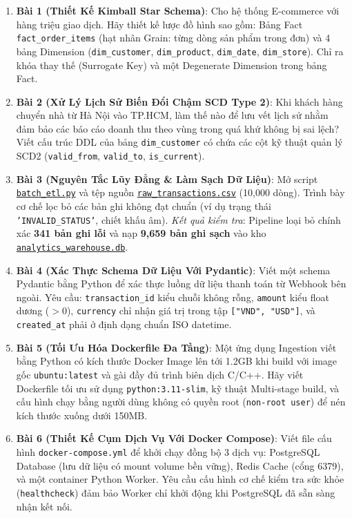 \begin{baitapbox}
\begin{enumerate}
    \item \textbf{Bài 1 (Thiết Kế Kimball Star Schema)}: Cho hệ thống E-commerce với hàng triệu giao dịch. Hãy thiết kế lược đồ hình sao gồm: Bảng Fact \texttt{fact\_order\_items} (hạt nhân Grain: từng dòng sản phẩm trong đơn) và 4 bảng Dimension (\texttt{dim\_customer}, \texttt{dim\_product}, \texttt{dim\_date}, \texttt{dim\_store}). Chỉ ra khóa thay thế (Surrogate Key) và một Degenerate Dimension trong bảng Fact.
    \item \textbf{Bài 2 (Xử Lý Lịch Sử Biến Đổi Chậm SCD Type 2)}: Khi khách hàng chuyển nhà từ Hà Nội vào TP.HCM, làm thế nào để lưu vết lịch sử nhằm đảm bảo các báo cáo doanh thu theo vùng trong quá khứ không bị sai lệch? Viết cấu trúc DDL của bảng \texttt{dim\_customer} có chứa các cột kỹ thuật quản lý SCD2 (\texttt{valid\_from}, \texttt{valid\_to}, \texttt{is\_current}).
    \item \textbf{Bài 3 (Nguyên Tắc Lũy Đẳng \& Làm Sạch Dữ Liệu)}: Mở script \href{run:./code/ch07_etl/batch_etl.py}{\texttt{batch\_etl.py}} và tệp nguồn \href{run:./data/raw_transactions.csv}{\texttt{raw\_transactions.csv}} (10,000 dòng). Trình bày cơ chế lọc bỏ các bản ghi không đạt chuẩn (ví dụ trạng thái \texttt{'INVALID\_STATUS'}, chiết khấu âm). \textit{Kết quả kiểm tra}: Pipeline loại bỏ chính xác \textbf{341 bản ghi lỗi} và nạp \textbf{9,659 bản ghi sạch} vào kho \href{run:./data/analytics_warehouse.db}{\texttt{analytics\_warehouse.db}}.
    \item \textbf{Bài 4 (Xác Thực Schema Dữ Liệu Với Pydantic)}: Viết một schema Pydantic bằng Python để xác thực luồng dữ liệu thanh toán từ Webhook bên ngoài. Yêu cầu: \texttt{transaction\_id} kiểu chuỗi không rỗng, \texttt{amount} kiểu float dương ($> 0$), \texttt{currency} chỉ nhận giá trị trong tập \texttt{["VND", "USD"]}, và \texttt{created\_at} phải ở định dạng chuẩn ISO datetime.
    \item \textbf{Bài 5 (Tối Ưu Hóa Dockerfile Đa Tầng)}: Một ứng dụng Ingestion viết bằng Python có kích thước Docker Image lên tới 1.2GB khi build với image gốc \texttt{ubuntu:latest} và gài đầy đủ trình biên dịch C/C++. Hãy viết Dockerfile tối ưu sử dụng \texttt{python:3.11-slim}, kỹ thuật Multi-stage build, và cấu hình chạy bằng người dùng không có quyền root (\texttt{non-root user}) để nén kích thước xuống dưới 150MB.
    \item \textbf{Bài 6 (Thiết Kế Cụm Dịch Vụ Với Docker Compose)}: Viết file cấu hình \texttt{docker-compose.yml} để khởi chạy đồng bộ 3 dịch vụ: PostgreSQL Database (lưu dữ liệu có mount volume bền vững), Redis Cache (cổng 6379), và một container Python Worker. Yêu cầu cấu hình cơ chế kiểm tra sức khỏe (\texttt{healthcheck}) đảm bảo Worker chỉ khởi động khi PostgreSQL đã sẵn sàng nhận kết nối.

\end{enumerate}
\end{baitapbox}
